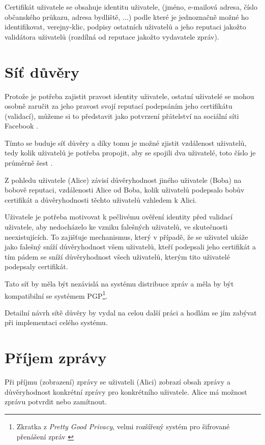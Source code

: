 \documentclass{report}
\begin{document}
Certifikát uživatele se obsahuje identitu uživatele, (jméno, e-mailová adresa, číslo občanského průkazu, adresa bydliště, ...) podle které je jednoznačně možné ho identifikovat, \gls{verejny-klic}, podpisy ostatních uživatelů a jeho reputaci jakožto validátora uživatelů (rozdílná od reputace jakožto vydavatele zpráv).

\section{Síť důvěry}
\label{sec:sit_duvery}

Protože je potřeba zajistit pravost identity uživatele, ostatní uživatelé se mohou osobně zaručit za jeho pravost svojí reputací podepsáním jeho certifikátu (validací), můžeme si to představit jako potvrzení přátelství na sociální síti Facebook \citep{intro99}.

Tímto se buduje síť důvěry a díky tomu je možné zjistit vzdálenost uživatelů, tedy kolik uživatelů je potřeba propojit, aby se spojili dva uživatelé, toto číslo je průměrně šest \citep{intro99}.

Z pohledu uživatele (Alice) závisí důvěryhodnost jiného uživatele (Boba) na bobově reputaci, vzdálenosti Alice od Boba, kolik uživatelů podepsalo bobův certifikát a důvěryhodnosti těchto uživatelů vzhledem k Alici.

Uživatele je potřeba motivovat k pečlivému ověření identity před validací uživatele, aby nedocházelo ke vzniku falešných uživatelů, ve skutečnosti neexistujících. To zajišťuje mechanismus, který v případě, že se uživatel ukáže jako falešný sníží důvěryhodnost všem uživatelů, kteří podepsali jeho certifikát a tím pádem se sníží důvěryhodnost všech uživatelů, kterým tito uživatelé podepsaly certifikát.

Tato síť by měla být nezávislá na systému distribuce zpráv a měla by být kompatibilní se systémem PGP\footnote{Zkratka z \textit{Pretty Good Privacy}, velmi rozšířený systém pro šifrované přenášení zpráv \citep{rfc4880}}.

Detailní návrh sítě důvěry by vydal na celou další práci a hodlám se jím zabývat při implementaci celého systému.

\section{Příjem zprávy}
\label{sec:prijem_zpravy}

Při příjmu (zobrazení) zprávy se uživateli (Alici) zobrazí obsah zprávy a důvěryhodnost konkrétní zprávy pro konkrétního uživatele. Alice má možnost zprávu potvrdit nebo zamítnout.
\end{document}
